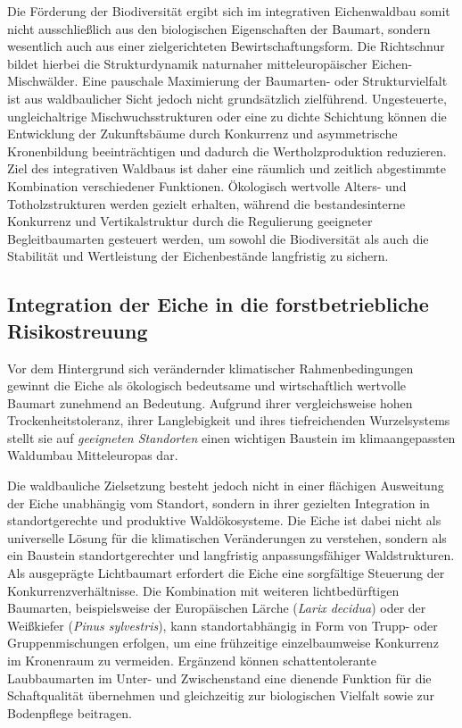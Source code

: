\documentclass[twocolumn, bibliography=totoc, abstract=true]{scrartcl}
\begin{document}
Die Förderung der Biodiversität ergibt sich im integrativen Eichenwaldbau somit nicht ausschließlich aus den biologischen Eigenschaften der Baumart, sondern wesentlich auch aus einer zielgerichteten Bewirtschaftungsform. Die Richtschnur bildet hierbei die Strukturdynamik naturnaher mitteleuropäischer Eichen-Mischwälder. Eine pauschale Maximierung der Baumarten- oder Strukturvielfalt ist aus waldbaulicher Sicht jedoch nicht grundsätzlich zielführend. Ungesteuerte, ungleichaltrige Mischwuchsstrukturen oder eine zu dichte Schichtung können die Entwicklung der Zukunftsbäume durch Konkurrenz und asymmetrische Kronenbildung beeinträchtigen und dadurch die Wertholzproduktion reduzieren. Ziel des integrativen Waldbaus ist daher eine räumlich und zeitlich abgestimmte Kombination verschiedener Funktionen. Ökologisch wertvolle Alters- und Totholzstrukturen werden gezielt erhalten, während die bestandesinterne Konkurrenz und Vertikalstruktur durch die Regulierung geeigneter Begleitbaumarten gesteuert werden, um sowohl die Biodiversität als auch die Stabilität und Wertleistung der Eichenbestände langfristig zu sichern.

\subsection{Integration der Eiche in die forstbetriebliche Risikostreuung}

Vor dem Hintergrund sich verändernder klimatischer Rahmenbedingungen gewinnt die Eiche als ökologisch bedeutsame und wirtschaftlich wertvolle Baumart zunehmend an Bedeutung. Aufgrund ihrer vergleichsweise hohen Trockenheitstoleranz, ihrer Langlebigkeit und ihres tiefreichenden Wurzelsystems stellt sie auf \emph{geeigneten Standorten} einen wichtigen Baustein im klimaangepassten Waldumbau Mitteleuropas dar.

Die waldbauliche Zielsetzung besteht jedoch nicht in einer flächigen Ausweitung der Eiche unabhängig vom Standort, sondern in ihrer gezielten Integration in standortgerechte und produktive Waldökosysteme. Die Eiche ist dabei nicht als universelle Lösung für die klimatischen Veränderungen zu verstehen, sondern als ein Baustein standortgerechter und langfristig anpassungsfähiger Waldstrukturen. Als ausgeprägte Lichtbaumart erfordert die Eiche eine sorgfältige Steuerung der Konkurrenzverhältnisse. Die Kombination mit weiteren lichtbedürftigen Baumarten, beispielsweise der Europäischen Lärche (\textit{Larix decidua}) oder der Weißkiefer (\textit{Pinus sylvestris}), kann standortabhängig in Form von Trupp- oder Gruppenmischungen erfolgen, um eine frühzeitige einzelbaumweise Konkurrenz im Kronenraum zu vermeiden. Ergänzend können schattentolerante Laubbaumarten im Unter- und Zwischenstand eine dienende Funktion für die Schaftqualität übernehmen und gleichzeitig zur biologischen Vielfalt sowie zur Bodenpflege beitragen.
\end{document}

